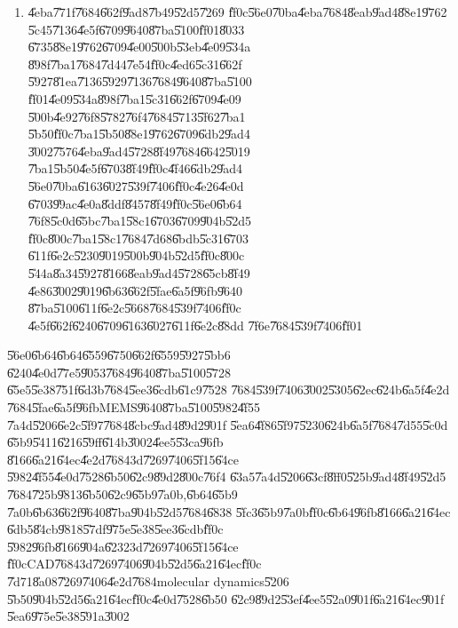 \documentclass[12pt,a4paper]{article}
\begin{document}
\begin{enumerate}
\item \U{4eba}\U{771f}\U{7684}\U{662f}\U{9ad8}\U{7b49}\U{52d5}\U{7269}%
\U{ff0c}\U{56e0}\U{70ba}\U{4eba}\U{7684}\U{8eab}\U{9ad4}\U{88e1}\U{9762}%
\U{5c45}\U{7136}\U{4e5f}\U{6709}\U{9640}\U{87ba}\U{5100}\U{ff01}\U{8033}%
\U{6735}\U{88e1}\U{9762}\U{6709}\U{4e00}\U{500b}\U{53eb}\U{4e09}\U{534a}%
\U{898f}\U{7ba1}\U{7684}\U{7d44}\U{7e54}\U{ff0c}\U{4ed6}\U{5c31}\U{662f}%
\U{5927}\U{81ea}\U{7136}\U{5929}\U{7136}\U{7684}\U{9640}\U{87ba}\U{5100}%
\U{ff01}\U{4e09}\U{534a}\U{898f}\U{7ba1}\U{5c31}\U{662f}\U{6709}\U{4e09}%
\U{500b}\U{4e92}\U{76f8}\U{5782}\U{76f4}\U{7684}\U{5713}\U{5f62}\U{7ba1}%
\U{5b50}\U{ff0c}\U{7ba1}\U{5b50}\U{88e1}\U{9762}\U{6709}\U{6db2}\U{9ad4}%
\U{3002}\U{7576}\U{4eba}\U{9ad4}\U{5728}\U{8f49}\U{7684}\U{6642}\U{5019}%
\U{7ba1}\U{5b50}\U{4e5f}\U{6703}\U{8f49}\U{ff0c}\U{4f46}\U{6db2}\U{9ad4}%
\U{56e0}\U{70ba}\U{6163}\U{6027}\U{539f}\U{7406}\U{ff0c}\U{4e26}\U{4e0d}%
\U{6703}\U{99ac}\U{4e0a}\U{8ddf}\U{8457}\U{8f49}\U{ff0c}\U{56e0}\U{6b64}%
\U{76f8}\U{5c0d}\U{65bc}\U{7ba1}\U{58c1}\U{6703}\U{6709}\U{904b}\U{52d5}%
\U{ff0c}\U{800c}\U{7ba1}\U{58c1}\U{7684}\U{7d68}\U{6bdb}\U{5c31}\U{6703}%
\U{611f}\U{6e2c}\U{5230}\U{9019}\U{500b}\U{904b}\U{52d5}\U{ff0c}\U{800c}%
\U{544a}\U{8a34}\U{5927}\U{8166}\U{8eab}\U{9ad4}\U{5728}\U{65cb}\U{8f49}%
\U{4e86}\U{3002}\U{9019}\U{6b63}\U{662f}\U{5fae}\U{6a5f}\U{96fb}\U{9640}%
\U{87ba}\U{5100}\U{611f}\U{6e2c}\U{5668}\U{7684}\U{539f}\U{7406}\U{ff0c}%
\U{4e5f}\U{662f}\U{6240}\U{6709}\U{6163}\U{6027}\U{611f}\U{6e2c}\U{88dd}%
\U{7f6e}\U{7684}\U{539f}\U{7406}\U{ff01}
\end{enumerate}

\U{56e0}\U{6b64}\U{6b64}\U{6559}\U{6750}\U{662f}\U{6559}\U{5927}\U{5bb6}%
\U{6240}\U{4e0d}\U{77e5}\U{9053}\U{7684}\U{9640}\U{87ba}\U{5100}\U{5728}%
\U{65e5}\U{5e38}\U{751f}\U{6d3b}\U{7684}\U{5ee3}\U{6cdb}\U{61c9}\U{7528}%
\U{7684}\U{539f}\U{7406}\U{3002}\U{5305}\U{62ec}\U{624b}\U{6a5f}\U{4e2d}%
\U{7684}\U{5fae}\U{6a5f}\U{96fb}MEMS\U{9640}\U{87ba}\U{5100}\U{5982}\U{4f55}%
\U{7a4d}\U{5206}\U{6e2c}\U{5f97}\U{7684}\U{8cbc}\U{9ad4}\U{89d2}\U{901f}%
\U{5ea6}\U{4f86}\U{5f97}\U{5230}\U{624b}\U{6a5f}\U{7684}\U{7d55}\U{5c0d}%
\U{65b9}\U{5411}\U{6216}\U{59ff}\U{614b}\U{3002}\U{4ee5}\U{53ca}\U{96fb}%
\U{8166}\U{6a21}\U{64ec}\U{4e2d}\U{7684}3d\U{7269}\U{7406}\U{5f15}\U{64ce}%
\U{5982}\U{4f55}\U{4e0d}\U{7528}\U{6b50}\U{62c9}\U{89d2}\U{800c}\U{76f4}%
\U{63a5}\U{7a4d}\U{5206}\U{63cf}\U{8ff0}\U{525b}\U{9ad4}\U{8f49}\U{52d5}%
\U{7684}\U{725b}\U{9813}\U{6b50}\U{62c9}\U{65b9}\U{7a0b},\U{6b64}\U{65b9}%
\U{7a0b}\U{6b63}\U{662f}\U{9640}\U{87ba}\U{904b}\U{52d5}\U{7684}\U{6838}%
\U{5fc3}\U{65b9}\U{7a0b}\U{ff0c}\U{6b64}\U{96fb}\U{8166}\U{6a21}\U{64ec}%
\U{6db5}\U{84cb}\U{9818}\U{57df}\U{975e}\U{5e38}\U{5ee3}\U{6cdb}\U{ff0c}%
\U{5982}\U{96fb}\U{8166}\U{904a}\U{6232}3d\U{7269}\U{7406}\U{5f15}\U{64ce}%
\U{ff0c}CAD\U{7684}3d\U{7269}\U{7406}\U{904b}\U{52d5}\U{6a21}\U{64ec}\U{ff0c}%
\U{7d71}\U{8a08}\U{7269}\U{7406}\U{4e2d}\U{7684}molecular dynamics\U{5206}%
\U{5b50}\U{904b}\U{52d5}\U{6a21}\U{64ec}\U{ff0c}\U{4e0d}\U{7528}\U{6b50}%
\U{62c9}\U{89d2}\U{53ef}\U{4ee5}\U{52a0}\U{901f}\U{6a21}\U{64ec}\U{901f}%
\U{5ea6}\U{975e}\U{5e38}\U{591a}\U{3002}
\end{document}
